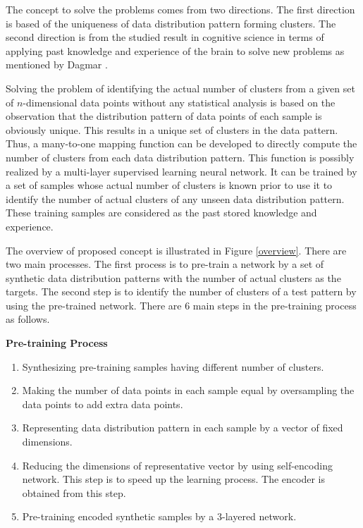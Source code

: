 \documentclass[lettersize,journal]{IEEEtran}
\begin{document}
The concept to solve the problems comes from two directions. The first direction is based of the 
uniqueness of data distribution pattern forming clusters. The second direction is from the studied 
result in cognitive science in terms of applying past knowledge and experience of the brain to solve new 
problems as mentioned by Dagmar \cite{Dagmar}.

Solving the problem of identifying the actual number of clusters from a given set of $n$-dimensional
data points without any statistical analysis is based on the observation that the distribution pattern
of data points of each sample is obviously unique. This results in a unique set of clusters in the 
data  pattern. Thus, a many-to-one mapping function can be developed to directly
compute the number of clusters from each data distribution pattern. This function is possibly 
realized by a multi-layer supervised learning neural network. It can be trained by a set of samples
whose actual number of clusters is known prior to use it to identify the number of actual clusters of
any unseen data distribution pattern. These training samples are considered as the past stored 
knowledge and experience.

The overview of proposed concept is illustrated in Figure \ref{overview}. There are two main processes.
The first process is to pre-train a network by a set of synthetic data distribution patterns with the
number of actual clusters as the targets. The second step is to identify the number of clusters of a test 
pattern by using the pre-trained network. There are 6 main steps in the pre-training process as follows.

\vspace{0.2in}
\noindent
{\bf Pre-training Process}
\begin{enumerate}
\item Synthesizing pre-training samples having different number of clusters.
\item Making the number of data points in each sample equal by oversampling the data points to add extra
data points.
\item Representing data distribution pattern in each sample by a vector of fixed dimensions.
\item Reducing the dimensions of representative vector by using self-encoding network. This step
is to speed up the learning process. The encoder is obtained from this step.
\item Pre-training encoded synthetic samples by a 3-layered network.
\end{enumerate}
\end{document}
